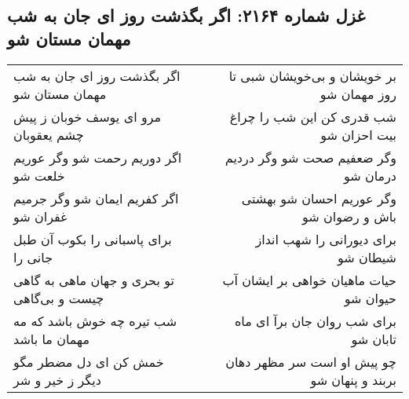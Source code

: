 \begin{center}
\section*{غزل شماره ۲۱۶۴: اگر بگذشت روز ای جان به شب مهمان مستان شو}
\label{sec:2164}
\begin{longtable}{l p{0.5cm} r}
اگر بگذشت روز ای جان به شب مهمان مستان شو
&&
بر خویشان و بی‌خویشان شبی تا روز مهمان شو
\\
مرو ای یوسف خوبان ز پیش چشم یعقوبان
&&
شب قدری کن این شب را چراغ بیت احزان شو
\\
اگر دوریم رحمت شو وگر عوریم خلعت شو
&&
وگر ضعفیم صحت شو وگر دردیم درمان شو
\\
اگر کفریم ایمان شو وگر جرمیم غفران شو
&&
وگر عوریم احسان شو بهشتی باش و رضوان شو
\\
برای پاسبانی را بکوب آن طبل جانی را
&&
برای دیورانی را شهب انداز شیطان شو
\\
تو بحری و جهان ماهی به گاهی چیست و بی‌گاهی
&&
حیات ماهیان خواهی بر ایشان آب حیوان شو
\\
شب تیره چه خوش باشد که مه مهمان ما باشد
&&
برای شب روان جان برآ ای ماه تابان شو
\\
خمش کن ای دل مضطر مگو دیگر ز خیر و شر
&&
چو پیش او است سر مظهر دهان بربند و پنهان شو
\\
\end{longtable}
\end{center}

